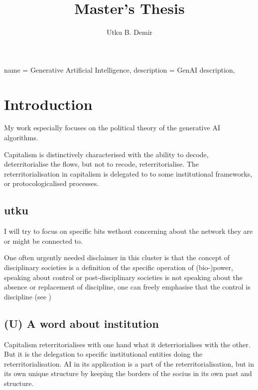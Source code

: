 
\usepackage{glossaries}
\makeglossaries
{}
{
  name =  Generative Artificial Intelligence,
  description = {GenAI description},
}


\title{Master's Thesis}
\author{Utku B. Demir}


\maketitle

\chapter{Introduction}\label{chap:Introduction} %

My work especially focuses on the political theory of the generative AI
algorithms.

Capitalism is distinctively characterised with the ability to decode,
deterritorialise the flows, but not to recode, reterritorialise. The
reterritorialisation in capitalism is delegated to to some institutional
frameworks, or protocologicalised processes.

\section{utku}
I will try to focus on specific bits wethout concerning about the network they
are or might be connected to.

One often urgently needed disclaimer in this cluster is that the concept of
disciplinary societies is a definition of the specific operation of
(bio-)power, speaking about control or post-disciplinary societies is not speaking about the absence or
replacement of discipline, one can freely emphasise that the control is
discipline (see \cite[]{kelly2015a} )

\section{(U) A word about institution}
Capitalism reterritorialises with one hand what it deterriorialises with the
other. But it is the delegation to specific institutional entities doing the
reterritorialisation. AI in its application is a part of the
reterritorialisation, but in its own unique structure by keeping the borders of
the socius in its own past and structure.

